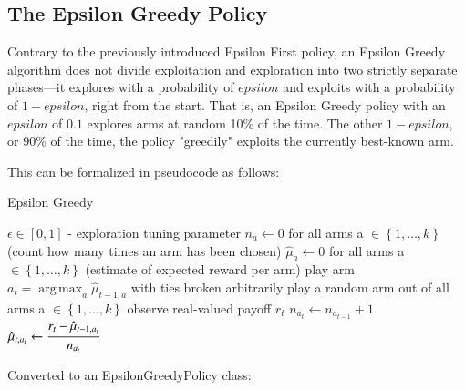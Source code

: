 \documentclass{jss}\usepackage[]{graphicx}\usepackage[]{color}
\DeclareMathOperator*{\argmax}{arg\,max}
\begin{document}
\subsection{The Epsilon Greedy Policy}

Contrary to the previously introduced Epsilon First policy, an Epsilon Greedy algorithm does not divide exploitation and exploration into two strictly separate phases---it explores with a probability of $epsilon$ and exploits with a probability of $1-epsilon$, right from the start. That is, an Epsilon Greedy policy with an $epsilon$ of $0.1$ explores arms at random 10\% of the time. The other $1-epsilon$, or 90\% of the time, the policy "greedily" exploits the currently best-known arm.

This can be formalized in pseudocode as follows:

\begin{algorithm}[H]
\caption{Epsilon Greedy}
\label{Alg:EpsilonGreedy}
\begin{algorithmic}
\REQUIRE \(    \epsilon  \in \left[ 0,1 \right] \) - exploration tuning parameter
\STATE \( n_{a} \leftarrow 0 \) for all arms a \(  \in \left\{ 1, \dots, k \right\} \)  (count how many times an arm has been chosen)
\STATE \( \hat{\mu}_{a} \leftarrow 0 \) for all arms a  \(   \in \left\{ 1, \dots, k \right\} \)  (estimate of expected reward per arm)
		\STATE play arm \(a_t = \argmax_a  \hat{\mu}_{t-1,a}  \) with ties broken arbitrarily
	\ELSE
		\STATE play a random arm out of all arms a \(  \in \left\{ 1, \dots, k \right\} \)
	\ENDIF
	\STATE observe real-valued payoff $r_t$
	\STATE \( n_{a_{t}} \leftarrow n_{a_{t-1}} + 1  \)
   \STATE \( \hat{\mu}_{t,a_{t}} \leftarrow   \cfrac{r_t - \hat{\mu}_{t-1,a_{t}} }{n_{a_{t}}}   \)
\ENDFOR
\end{algorithmic}
\end{algorithm}

Converted to an EpsilonGreedyPolicy class:
\end{document}
